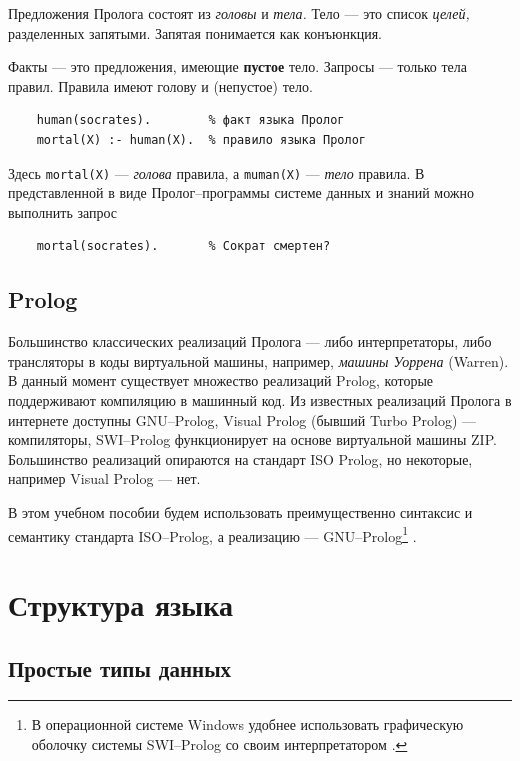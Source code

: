 \documentclass[12pt, openany, twoside]{book} %
\begin{document}
Предложения Пролога состоят из \emph{головы} и \emph{тела.} Тело --- это список \emph{целей,} разделенных запятыми. Запятая понимается как конъюнкция.

Факты --- это предложения, имеющие {\bf пустое} тело. Запросы --- только тела правил. Правила имеют голову и (непустое) тело.

{\tt\begin{verbatim}
    human(socrates).        % факт языка Пролог
    mortal(X) :- human(X).  % правило языка Пролог
\end{verbatim}}

Здесь {\tt mortal(X)} --- {\em голова} правила, а {\tt muman(X)} --- {\em тело} правила. В представленной в виде Пролог--программы системе данных и знаний можно выполнить запрос
{\tt\begin{verbatim}
    mortal(socrates).       % Сократ смертен?
\end{verbatim}}


\subsection{Prolog}

Большинство классических реализаций Пролога --- либо интерпретаторы, либо трансляторы в коды виртуальной машины, например, {\em машины Уоррена} (Warren). В данный момент существует множество реализаций Prolog, которые поддерживают компиляцию в машинный код. Из известных реализаций Пролога в интернете доступны GNU--Prolog, Visual Prolog (бывший Turbo Prolog) --- компиляторы, SWI--Prolog функционирует на основе виртуальной машины ZIP. Большинство реализаций опираются на стандарт ISO Prolog, но некоторые, например Visual Prolog --- нет.

В этом учебном пособии будем использовать преимущественно синтаксис и семантику стандарта ISO--Prolog, а реализацию --- GNU--Prolog\footnote{В операционной системе Windows удобнее использовать графическую оболочку системы SWI--Prolog со своим интерпретатором \cite{SWIP}.} \cite{GNUP}.

\section{Структура языка}

\subsection{Простые типы данных}
\end{document}

